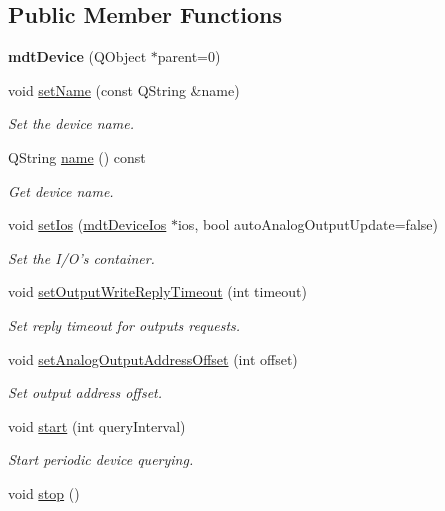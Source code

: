 \subsection*{Public Member Functions}
\begin{DoxyCompactItemize}
\item 
\hypertarget{classmdt_device_a6d501791e7243358cc61b144254b80db}{
{\bfseries mdtDevice} (QObject $\ast$parent=0)}
\label{classmdt_device_a6d501791e7243358cc61b144254b80db}

\item 
\hypertarget{classmdt_device_a80186f1aa6fbdc13f1652de978c35518}{
void \hyperlink{classmdt_device_a80186f1aa6fbdc13f1652de978c35518}{setName} (const QString \&name)}
\label{classmdt_device_a80186f1aa6fbdc13f1652de978c35518}

\begin{DoxyCompactList}\small\item\em Set the device name. \end{DoxyCompactList}\item 
\hypertarget{classmdt_device_a7ad893c6885dbaef5a6cb980bfe627e0}{
QString \hyperlink{classmdt_device_a7ad893c6885dbaef5a6cb980bfe627e0}{name} () const }
\label{classmdt_device_a7ad893c6885dbaef5a6cb980bfe627e0}

\begin{DoxyCompactList}\small\item\em Get device name. \end{DoxyCompactList}\item 
void \hyperlink{classmdt_device_a61b7bb9885f77b7e733f87a6134f2509}{setIos} (\hyperlink{classmdt_device_ios}{mdtDeviceIos} $\ast$ios, bool autoAnalogOutputUpdate=false)
\begin{DoxyCompactList}\small\item\em Set the I/O's container. \end{DoxyCompactList}\item 
void \hyperlink{classmdt_device_ad1f52eecd93931580b9ba88919f32509}{setOutputWriteReplyTimeout} (int timeout)
\begin{DoxyCompactList}\small\item\em Set reply timeout for outputs requests. \end{DoxyCompactList}\item 
void \hyperlink{classmdt_device_a3477278b4fa937f7667becb14333ef2f}{setAnalogOutputAddressOffset} (int offset)
\begin{DoxyCompactList}\small\item\em Set output address offset. \end{DoxyCompactList}\item 
void \hyperlink{classmdt_device_a721c5bf2cfa0eef5304333f08da182f7}{start} (int queryInterval)
\begin{DoxyCompactList}\small\item\em Start periodic device querying. \end{DoxyCompactList}\item 
\hypertarget{classmdt_device_adc7ff8f01d68506283a3d0cc6bc25407}{
void \hyperlink{classmdt_device_adc7ff8f01d68506283a3d0cc6bc25407}{stop} ()}
\label{classmdt_device_adc7ff8f01d68506283a3d0cc6bc25407}


\end{DoxyCompactItemize}
